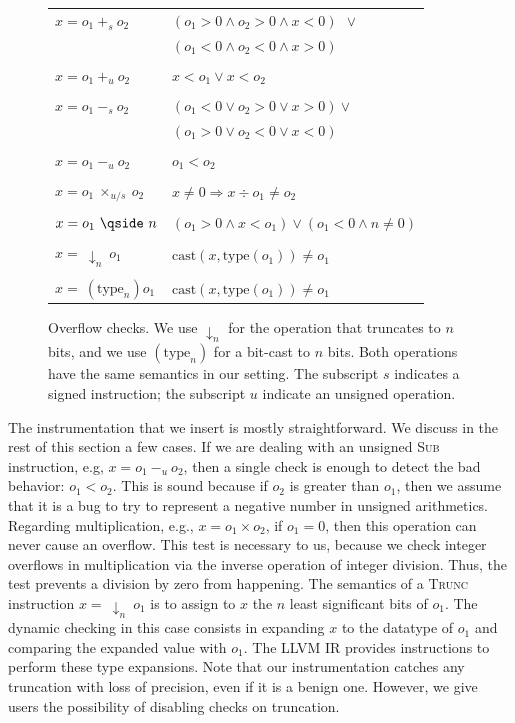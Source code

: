 \documentclass[preprint]{sigplanconf}[10pt]
\begin{document}
\begin{figure}[t!]
\begin{center}
\begin{tabular}{ll}
$x = o_1 \ +_s \ o_2$ & $(o_1 > 0 \wedge o_2 > 0 \wedge x < 0) \ \ \vee$ \\
                  & $(o_1 < 0 \wedge o_2 < 0 \wedge x > 0)$ \\ \\
$x = o_1 \ +_u \ o_2$ & $x < o_1 \vee x < o_2$ \\ \\
$x = o_1 \ -_s \ o_2$ & $(o_1 < 0 \vee o_2 > 0 \vee x > 0) \vee$ \\
                  & $(o_1 > 0 \vee o_2 < 0 \vee x < 0)$ \\ \\
$x = o_1 \ -_u \ o_2$ & $o_1 < o_2$ \\ \\
$x = o_1 \ \times_{u/s} \ o_2$ & $x \neq 0 \Rightarrow x \div o_1 \neq o_2$ \\ \\
$x = o_1 \ \qside \ n$ & $(o_1 > 0 \wedge x < o_1) \vee (o_1 < 0 \wedge n \neq 0)$ \\ \\
$x = \ \downarrow_n \ o_1$ & $\mbox{cast}(x, \mbox{type}(o_1)) \neq o_1$ \\ \\
$x = \ (\mbox{type}_n) o_1$ & $\mbox{cast}(x, \mbox{type}(o_1)) \neq o_1$ \\
\end{tabular}
\end{center}
\caption{\label{fig:instrumentation}Overflow checks. We use $\downarrow_n$ for
the operation that truncates to $n$ bits, and we use $(\mbox{type}_n)$ for a
bit-cast to $n$ bits. Both operations have the same semantics in our setting.
The subscript $s$ indicates a signed instruction; the subscript $u$ indicate
an unsigned operation.}
\end{figure}

The instrumentation that we insert is mostly straightforward.
We discuss in the rest of this section a few cases.
If we are dealing with an unsigned \textsc{Sub} instruction, e.g,
$x = o_1 \ -_u \ o_2$, then a single check is enough to detect the bad
behavior: $o_1 < o_2$.
This is sound because if $o_2$ is greater than $o_1$, then we assume that it is
a bug to try to represent a negative number in unsigned arithmetics.
Regarding multiplication, e.g., $x = o_1 \times o_2$, if $o_1 = 0$, then this
operation can never cause an overflow.
This test is necessary to us, because we check integer overflows in
multiplication via the inverse operation of integer division.
Thus, the test prevents a division by zero from happening.
The semantics of a \textsc{Trunc} instruction $x = \ \downarrow_n \ o_1$ is
to assign to $x$ the $n$ least significant bits of $o_1$.
The dynamic checking in this case consists in expanding $x$ to
the datatype of $o_1$ and comparing the expanded value with $o_1$.
The LLVM IR provides instructions to perform these type expansions.
Note that our instrumentation catches any truncation with loss of precision, even
if it is a benign one.
However, we give users the possibility of disabling checks on truncation.
\end{document}
